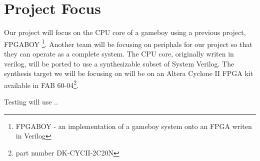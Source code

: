 \section{Project Focus}
Our project will focus on the CPU core of a gameboy using a previous project,
FPGABOY \footnote{FPGABOY - an implementation of a gameboy system onto an FPGA 
writen in Verilog}. Another team will be focusing on periphals for our project 
so that they can operate as a complete system. The CPU core, originally writen 
in verilog, will be ported to use a synthesizable subset of System Verilog.
The synthesis target we will be focusing on will be on an Altera Cyclone II 
FPGA kit available in FAB 60-04\footnote{part number DK-CYCII-2C20N}.

Testing will use ..

